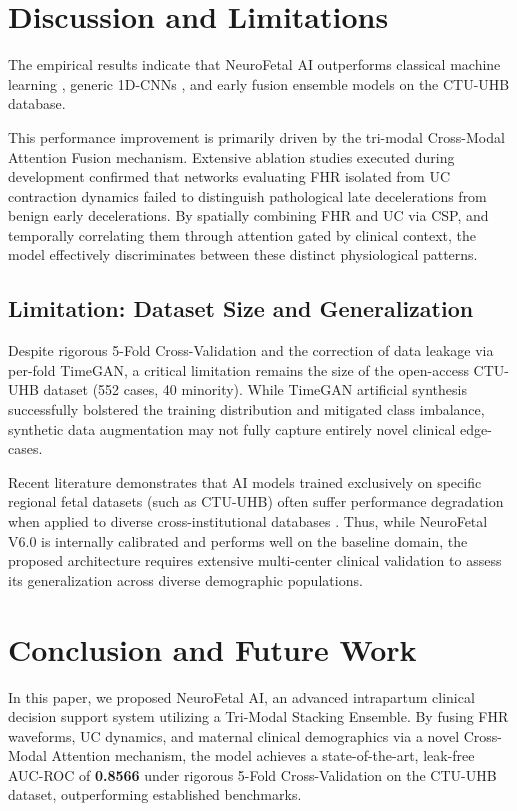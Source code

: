 
\section{Discussion and Limitations}
The empirical results indicate that NeuroFetal AI outperforms classical machine learning \cite{spilka2012}, generic 1D-CNNs \cite{spilka2016}, and early fusion ensemble models \cite{mendis2023} on the CTU-UHB database. 

This performance improvement is primarily driven by the tri-modal Cross-Modal Attention Fusion mechanism. Extensive ablation studies executed during development confirmed that networks evaluating FHR isolated from UC contraction dynamics failed to distinguish pathological late decelerations from benign early decelerations. By spatially combining FHR and UC via CSP, and temporally correlating them through attention gated by clinical context, the model effectively discriminates between these distinct physiological patterns.

\subsection{Limitation: Dataset Size and Generalization}
Despite rigorous 5-Fold Cross-Validation and the correction of data leakage via per-fold TimeGAN, a critical limitation remains the size of the open-access CTU-UHB dataset (552 cases, 40 minority). While TimeGAN artificial synthesis successfully bolstered the training distribution and mitigated class imbalance, synthetic data augmentation may not fully capture entirely novel clinical edge-cases.

Recent literature demonstrates that AI models trained exclusively on specific regional fetal datasets (such as CTU-UHB) often suffer performance degradation when applied to diverse cross-institutional databases \cite{lopes2025}. Thus, while NeuroFetal V6.0 is internally calibrated and performs well on the baseline domain, the proposed architecture requires extensive multi-center clinical validation to assess its generalization across diverse demographic populations.

\section{Conclusion and Future Work}
In this paper, we proposed NeuroFetal AI, an advanced intrapartum clinical decision support system utilizing a Tri-Modal Stacking Ensemble. By fusing FHR waveforms, UC dynamics, and maternal clinical demographics via a novel Cross-Modal Attention mechanism, the model achieves a state-of-the-art, leak-free AUC-ROC of \textbf{0.8566} under rigorous 5-Fold Cross-Validation on the CTU-UHB dataset, outperforming established benchmarks.


